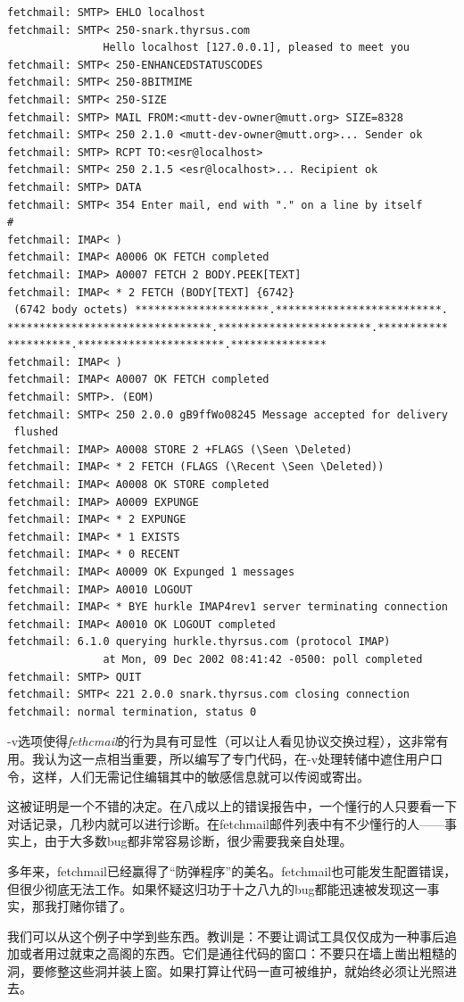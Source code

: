 \documentclass[12pt,oneside]{book}
\begin{document}
\begin{Verbatim}[label=例6.1  fetchmail的-v记录实例]
fetchmail: SMTP> EHLO localhost
fetchmail: SMTP< 250-snark.thyrsus.com 
               Hello localhost [127.0.0.1], pleased to meet you
fetchmail: SMTP< 250-ENHANCEDSTATUSCODES
fetchmail: SMTP< 250-8BITMIME
fetchmail: SMTP< 250-SIZE
fetchmail: SMTP> MAIL FROM:<mutt-dev-owner@mutt.org> SIZE=8328
fetchmail: SMTP< 250 2.1.0 <mutt-dev-owner@mutt.org>... Sender ok
fetchmail: SMTP> RCPT TO:<esr@localhost>
fetchmail: SMTP< 250 2.1.5 <esr@localhost>... Recipient ok
fetchmail: SMTP> DATA
fetchmail: SMTP< 354 Enter mail, end with "." on a line by itself
#
fetchmail: IMAP< )
fetchmail: IMAP< A0006 OK FETCH completed
fetchmail: IMAP> A0007 FETCH 2 BODY.PEEK[TEXT]
fetchmail: IMAP< * 2 FETCH (BODY[TEXT] {6742}
 (6742 body octets) *********************.**************************.
********************************.************************.***********
**********.***********************.***************
fetchmail: IMAP< )
fetchmail: IMAP< A0007 OK FETCH completed
fetchmail: SMTP>. (EOM)
fetchmail: SMTP< 250 2.0.0 gB9ffWo08245 Message accepted for delivery
 flushed
fetchmail: IMAP> A0008 STORE 2 +FLAGS (\Seen \Deleted)
fetchmail: IMAP< * 2 FETCH (FLAGS (\Recent \Seen \Deleted))
fetchmail: IMAP< A0008 OK STORE completed
fetchmail: IMAP> A0009 EXPUNGE
fetchmail: IMAP< * 2 EXPUNGE
fetchmail: IMAP< * 1 EXISTS
fetchmail: IMAP< * 0 RECENT
fetchmail: IMAP< A0009 OK Expunged 1 messages
fetchmail: IMAP> A0010 LOGOUT
fetchmail: IMAP< * BYE hurkle IMAP4rev1 server terminating connection
fetchmail: IMAP< A0010 OK LOGOUT completed
fetchmail: 6.1.0 querying hurkle.thyrsus.com (protocol IMAP) 
               at Mon, 09 Dec 2002 08:41:42 -0500: poll completed
fetchmail: SMTP> QUIT
fetchmail: SMTP< 221 2.0.0 snark.thyrsus.com closing connection
fetchmail: normal termination, status 0
\end{Verbatim}

-v选项使得\textit{fethcmail}的行为具有可显性（可以让人看见协议交换过程），这非常有用。我认为这一点相当重要，所以编写了专门代码，在-v处理转储中遮住用户口令，这样，人们无需记住编辑其中的敏感信息就可以传阅或寄出。

这被证明是一个不错的决定。在八成以上的错误报告中，一个懂行的人只要看一下对话记录，几秒内就可以进行诊断。在fetchmail邮件列表中有不少懂行的人——事实上，由于大多数bug都非常容易诊断，很少需要我亲自处理。

多年来，fetchmail已经赢得了“防弹程序”的美名。fetchmail也可能发生配置错误，但很少彻底无法工作。如果怀疑这归功于十之八九的bug都能迅速被发现这一事实，那我打赌你错了。

我们可以从这个例子中学到些东西。教训是：不要让调试工具仅仅成为一种事后追加或者用过就束之高阁的东西。它们是通往代码的窗口：不要只在墙上凿出粗糙的洞，要修整这些洞并装上窗。如果打算让代码一直可被维护，就始终必须让光照进去。
\end{document}
